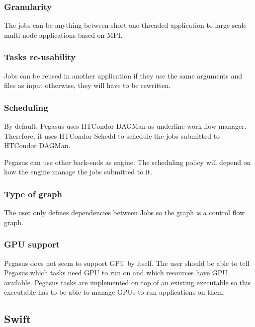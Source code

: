 \subsubsection{Granularity}
The jobs can be anything between short one threaded application to large scale multi-node applications based on MPI.

\subsubsection{Tasks re-usability}
Jobs can be reused in another application if they use the same arguments and files as input otherwise, they will have to be rewritten.


\subsubsection{Scheduling}
By default, Pegasus uses HTCondor DAGMan \cite{ThaTL2002} as underline work-flow manager.
Therefore, it uses HTCondor Schedd to schedule the jobs submitted to HTCondor DAGMan.

Pegasus can use  other back-ends as engine.
The scheduling policy will depend on how the engine manage the jobs submitted to it.


\subsubsection{Type of graph}
The user only defines dependencies between Jobs so the graph is a control flow graph.

\subsubsection{GPU support}
Pegasus does not seem to support GPU by itself.
The user should be able to tell Pegasus which tasks need GPU to run on and which resources have GPU available.
Pegasus tasks are implemented on top of an existing executable so this executable has to be able to manage GPUs to run applications on them.



\subsection{Swift}
